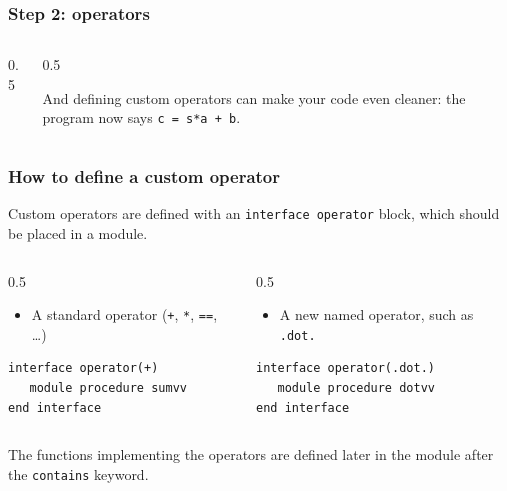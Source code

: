 \begin{frame}[fragile]
  \frametitle{Step 2: operators}
  \begin{columns}[T]
    \begin{column}{0.5\textwidth}
          
    \end{column}

    \begin{column}{0.5\textwidth}
    
    And defining custom operators can make your code even cleaner: the program now says \mbox{\texttt{c = s*a + b}}.
    \end{column}
  \end{columns}
\end{frame}


\begin{frame}[fragile]
  \frametitle{How to define a custom operator}
  Custom operators are defined with an \texttt{interface operator} block, which should be placed in a module.
  \vspace*{2mm}

  \begin{columns}[T]
    \begin{column}{0.5\textwidth}
      \begin{itemize}
            \item A standard operator (\texttt{+}, \texttt{*}, \texttt{==}, \ldots)
      \end{itemize}
\begin{lstlisting}
interface operator(+)
   module procedure sumvv
end interface
\end{lstlisting}
    \end{column}

    \begin{column}{0.5\textwidth}
      \begin{itemize}
            \item A new named operator, such as \texttt{.dot.}
      \end{itemize}
\begin{lstlisting}
interface operator(.dot.)
   module procedure dotvv
end interface
\end{lstlisting}
    \end{column}
  \end{columns}

  \vspace*{2mm}
  The functions implementing the operators are defined later in the module after the \texttt{contains} keyword.
\end{frame}


